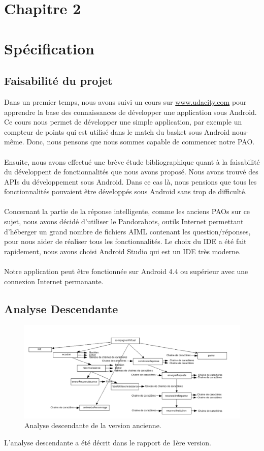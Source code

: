 \section*{Chapitre 2}
\section{Spécification}
\subsection{Faisabilité du projet}
Dans un premier temps, nous avons suivi un cours sur \url{www.udacity.com} pour apprendre la base des connaissances de développer une application sous Android. Ce cours nous permet de développer une simple application, par exemple un compteur de points qui est utilisé dans le match du basket sous Android nous-même. Donc, nous pensons que nous sommes capable de commencer notre PAO.\\\\
\indent Ensuite, nous avons effectué une brève étude bibliographique quant à la faisabilité du développent de fonctionnalités que nous avons proposé. Nous avons trouvé des APIs du développement sous Android. Dans ce cas là, nous pensions que tous les fonctionnalités pouvaient être développés sous Android sans trop de difficulté. \\\\
\indent Concernant la partie de la réponse intelligente, comme les anciens PAOs sur ce sujet, nous avons décidé d'utiliser le Pandorabots, outils Internet permettant d'héberger un grand nombre de fichiers AIML contenant les question/réponses, pour nous aider de réaliser tous les fonctionnalités.
Le choix du IDE a été fait rapidement, nous avons choisi Android Studio qui est un IDE très moderne. \\\\
\indent Notre application peut être fonctionnée sur Android 4.4 ou supérieur avec une connexion Internet permanante.\\

\subsection{Analyse Descendante}
\begin{figure}[h]
\centering
\includegraphics[width=1\linewidth]{analyseDescendante.png}
\caption{Analyse descendante de la version ancienne.\label{fig1}}
\end{figure}
\indent L'analyse descendante a été décrit dans le rapport  de 1ère version.
\newpage
